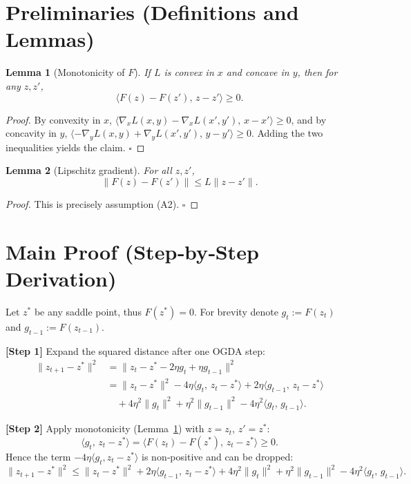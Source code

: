 \documentclass{article}
\newtheorem{lemma}{Lemma}
\begin{document}
\newpage
\section*{Preliminaries (Definitions and Lemmas)}
\begin{lemma}[Monotonicity of $F$]\label{lem:mono}
If $L$ is convex in $x$ and concave in $y$, then for any $z,z'$,
\[
\langle F(z)-F(z'),\,z-z'\rangle\ge0.
\]
\end{lemma}
\begin{proof}
By convexity in $x$,
$\langle\nabla_x L(x,y)-\nabla_x L(x',y'),\,x-x'\rangle\ge0$,
and by concavity in $y$,
$\langle-\nabla_y L(x,y)+\nabla_y L(x',y'),\,y-y'\rangle\ge0$.
Adding the two inequalities yields the claim. \hfill $\square$
\end{proof}

\begin{lemma}[Lipschitz gradient]\label{lem:lips}
For all $z,z'$,
\[
\|F(z)-F(z')\|\le L\|z-z'\|.
\]
\end{lemma}
\begin{proof}
This is precisely assumption (A2). \hfill $\square$
\end{proof}

\section*{Main Proof (Step‑by‑Step Derivation)}
Let $z^*$ be any saddle point, thus $F(z^*)=0$.  
For brevity denote $g_t:=F(z_t)$ and $g_{t-1}:=F(z_{t-1})$.

\noindent\textbf{[Step 1]} Expand the squared distance after one OGDA step:
\[
\begin{aligned}
\|z_{t+1}-z^*\|^{2}
&=\big\|z_t-z^* -2\eta g_t+\eta g_{t-1}\big\|^{2}\\[1mm]
&=\|z_t-z^*\|^{2}
   -4\eta\langle g_t,\,z_t-z^*\rangle
   +2\eta\langle g_{t-1},\,z_t-z^*\rangle\\[1mm]
&\quad +4\eta^{2}\|g_t\|^{2}
   +\eta^{2}\|g_{t-1}\|^{2}
   -4\eta^{2}\langle g_t,\,g_{t-1}\rangle .
\end{aligned}
\tag{4}
\]

\noindent\textbf{[Step 2]} Apply monotonicity (Lemma~\ref{lem:mono}) with $z=z_t$, $z'=z^*$:
\[
\langle g_t,\,z_t-z^*\rangle
   =\langle F(z_t)-F(z^*),\,z_t-z^*\rangle\ge0 .
\tag{5}
\]
Hence the term $-4\eta\langle g_t, z_t-z^*\rangle$ is non‑positive and can be dropped:
\[
\|z_{t+1}-z^*\|^{2}
\le \|z_t-z^*\|^{2}
   +2\eta\langle g_{t-1},\,z_t-z^*\rangle
   +4\eta^{2}\|g_t\|^{2}
   +\eta^{2}\|g_{t-1}\|^{2}
   -4\eta^{2}\langle g_t,\,g_{t-1}\rangle .
\tag{6}
\]
\end{document}
